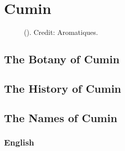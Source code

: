 \section{Cumin}
\label{sec:cumin}



\begin{figure}[!ht]
	\vspace{-2ex}
	\centering
	\hfill
	\caption[Cumin]{ (). Credit: Aromatiques.}
	\label{fig:cumin_imgs}
\end{figure}

\subsection{The Botany of Cumin}

\subsection{The History of Cumin}

\subsection{The Names of Cumin}

\subsubsection{English}

